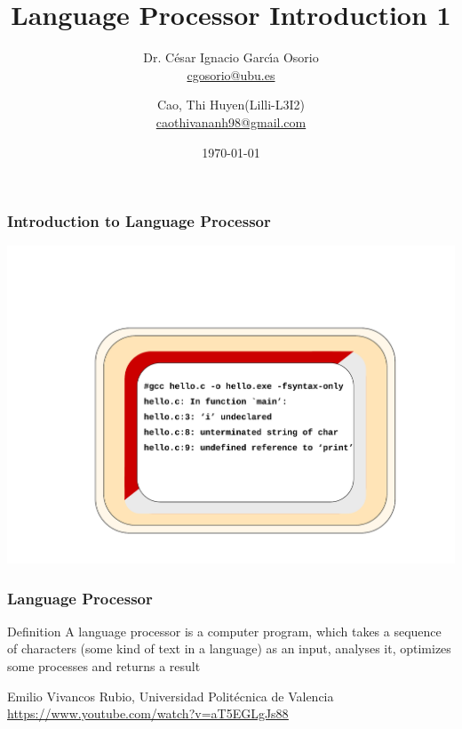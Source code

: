 \documentclass{beamer}
\title{Language Processor Introduction 1}
\subtitle{Dr. C\'esar Ignacio Garc\'{\i}a Osorio \\ \href{mailto:cgosorio@ubu.es}{cgosorio@ubu.es}}
\author{Cao, Thi Huyen(Lilli-L3I2) \\ \href{mailto:caothivananh98@gmail.com}{caothivananh98@gmail.com}}
\institute{University of Burgos}
\date{\today}
\begin{document}
\begin{frame}
\titlepage
\end{frame}


\begin{frame}
\frametitle{Introduction to Language Processor}
\begin{center}
\includegraphics[scale=0.5]{1}
\end{center}
\end{frame}


\begin{frame}
\frametitle{Language Processor}
\begin{block}{Definition}
A language processor is a computer program, which takes a sequence of characters (some kind of text in a language) as an input, analyses it, optimizes some processes and returns a result
\end{block}
Emilio Vivancos
Rubio, Universidad Politécnica de Valencia
\href{https://www.youtube.com/watch?v=aT5EGLgJs88/}{\underline{https://www.youtube.com/watch?v=aT5EGLgJs88}}
\end{frame}
\end{document}
